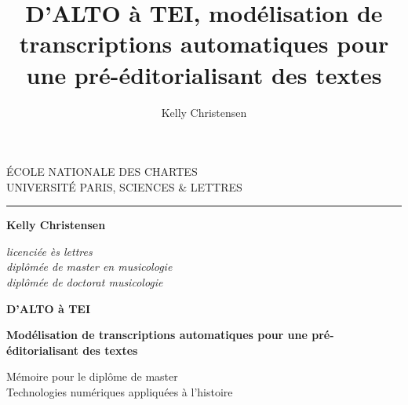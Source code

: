 \documentclass[a4paper,12pt,twoside]{book}
\author{Kelly Christensen}
\title{D’ALTO à TEI, modélisation de transcriptions automatiques pour une pré-éditorialisant des textes}
\begin{document}
	\begin{titlepage}
		\begin{center}
			
			\bigskip
			
			\begin{large}				
				ÉCOLE NATIONALE DES CHARTES\\
				UNIVERSITÉ PARIS, SCIENCES \& LETTRES
			\end{large}
			\begin{center}\rule{2cm}{0.02cm}\end{center}
			
			\bigskip
			\bigskip
			\bigskip
			\begin{Large}
				\textbf{Kelly Christensen}\\
			\end{Large}
			\begin{normalsize} 
				\textit{licenciée ès lettres}\\
				\textit{diplômée de master en musicologie}\\
				\textit{diplômée de doctorat musicologie}
			\end{normalsize}
			
			\bigskip
			\bigskip
			\bigskip
			
			\begin{Huge}
				\textbf{D’ALTO à TEI}\\
			\end{Huge}
			\bigskip
			\bigskip
			\begin{LARGE}
				\textbf{Modélisation de transcriptions automatiques pour une pré-éditorialisant des textes}\\
			\end{LARGE}
			
			\bigskip
			\bigskip
			\bigskip
			\begin{large}
			\end{large}
			\vfill
			
			\begin{large}
				Mémoire 
				pour le diplôme de master \\
				\og{} Technologies numériques appliquées à l'histoire \fg{} \\
			\end{large}
			
		\end{center}
	\end{titlepage}
	
	\thispagestyle{empty}	
	\cleardoublepage
	
\end{document}
